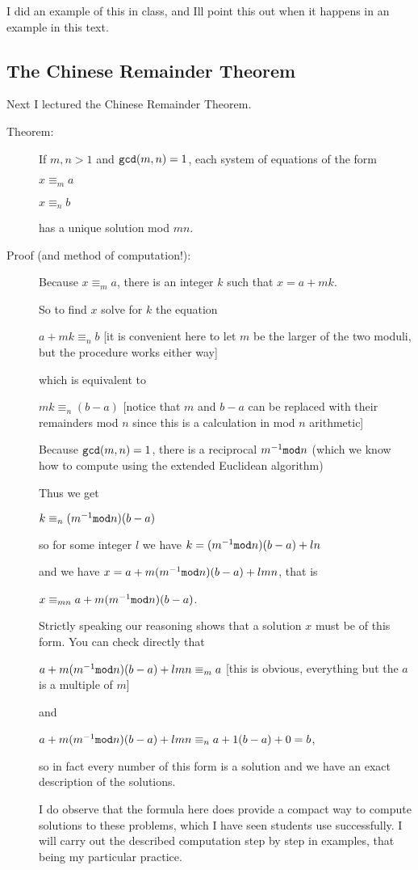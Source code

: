 \documentclass[12pt]{article}
\begin{document}
I did an example of this in class, and Ill point this out when it happens in an example in this text.

\subsection{The Chinese Remainder Theorem}

Next I lectured the Chinese Remainder Theorem.

\begin{description}

\item[Theorem:]  If $m,n >1$ and ${\tt gcd}(m,n)=1$, each system of equations of the form

$x\equiv_m a$

$x \equiv_n b$

has a unique solution mod $mn$.

\item[Proof (and method of computation!):]  Because $x \equiv_m a$, there is an integer $k$ such that
$x = a+mk$.

So to find $x$ solve for $k$ the equation 

 $a+mk \equiv_n b$  [it is convenient here to let $m$ be the larger of the two moduli, but the procedure works either way]

which is equivalent to

$mk \equiv_n (b-a)$  [notice that $m$ and $b-a$ can be replaced with their remainders mod $n$ since this is a calculation in mod $n$ arithmetic]

Because ${\tt gcd}(m,n)=1$, there is a reciprocal $m^{-1} {\tt mod} n$ (which we know how to compute using the extended Euclidean algorithm)

Thus we get

$k \equiv_n (m^{-1} {\tt mod} n)(b-a)$

so for some integer $l$ we have $k=(m^{-1} {\tt mod} n)(b-a) + ln$

and we have $x = a + m(m^{-1} {\tt mod} n)(b-a) + lmn$, that is

$x \equiv_{mn} a + m(m^{-1} {\tt mod} n)(b-a)$.

Strictly speaking our reasoning shows that a solution $x$ must be of this form.  You can check directly that

$a + m(m^{-1} {\tt mod} n)(b-a) + lmn \equiv_m a$ [this is obvious, everything but the $a$ is a multiple of $m$]

and

$a +m(m^{-1}{\tt mod} n)(b-a) + lmn \equiv_n a + 1(b-a) + 0 = b$,

so in fact every number of this form is a solution and we have an exact description of the solutions.

I do observe that the formula here does provide a compact way to compute solutions to these problems, which I have seen students use successfully.  I will carry out the described computation step by step in examples, that being my particular practice.


\end{description}
\end{document}
